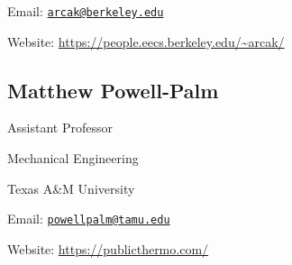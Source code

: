 \begin{references}
\begin{adjustwidth}{\sectionwidth}{}
Email: \href{mailto:arcak@berkeley.edu}{\texttt{arcak@berkeley.edu}}

Website: \url{https://people.eecs.berkeley.edu/~arcak/}
\end{adjustwidth}

\vspace*{\subsectionskip}

\subsection{Matthew Powell-Palm}
\cvdates{}{}

\begin{adjustwidth}{\sectionwidth}{}
Assistant Professor

Mechanical Engineering

Texas A\&M University

Email: \href{mailto:powellpalm@tamu.edu}{\texttt{powellpalm@tamu.edu}}

Website: \url{https://publicthermo.com/}
\end{adjustwidth}
\end{references}
